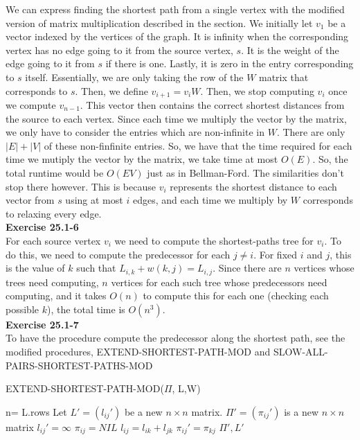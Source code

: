 \documentclass{article}
\begin{document}
We can express finding the shortest path from a single vertex with the modified version of matrix multiplication described in the section. We initially let $v_1$ be a vector indexed by the vertices of the graph. It is infinity when the corresponding vertex has no edge going to it from the source vertex, $s$. It is the weight of the edge going to it from $s$ if there is one. Lastly, it is zero in the entry corresponding to $s$ itself. Essentially, we are only taking the row of the $W$ matrix that corresponds to $s$. Then, we define $v_{i+1} = v_i W$. Then, we stop computing $v_i$ once we compute $v_{n-1}$. This vector then contains the correct shortest distances from the source to each vertex. Since each time we multiply the vector by the matrix, we only have to consider the entries which are non-infinite in $W$. There are only $|E|+|V|$ of these non-finfinite entries. So, we have that the time required for each time we mutiply the vector by the matrix, we take time at most $O(E)$. So, the total runtime would be $O(EV)$ just as in Bellman-Ford. The similarities don't stop there however. This is because $v_i$ represents the shortest distance to each vector from $s$ using at most $i$ edges, and each time we multiply by $W$ corresponds to relaxing every edge.\\

\noindent\textbf{Exercise 25.1-6}\\

For each source vertex $v_i$ we need to compute the shortest-paths tree for $v_i$.  To do this, we need to compute the predecessor for each $j \neq i$.  For fixed $i$ and $j$, this is the value of $k$ such that $L_{i,k} + w(k,j) = L_{i,j}$. Since there are $n$ vertices whose trees need computing, $n$ vertices for each such tree whose predecessors need computing, and it takes $O(n)$ to compute this for each one (checking each possible $k$), the total time is $O(n^3)$. \\

\noindent\textbf{Exercise 25.1-7}\\
To have the procedure compute the predecessor along the shortest path, see the modified procedures, EXTEND-SHORTEST-PATH-MOD and SLOW-ALL-PAIRS-SHORTEST-PATHS-MOD

\begin{algorithm}
\caption{EXTEND-SHORTEST-PATH-MOD($\Pi$, L,W)}
\begin{algorithmic}
\State n= L.rows
\State Let $L' = (l_{ij}')$ be a new $n\times n$ matrix.
\State $\Pi' = (\pi_{ij}')$ is a new $n\times n$ matrix
\State $l_{ij}' = \infty$
\State $\pi_{ij} = NIL$
\State $l_{ij} = l_{ik}+l_{jk}$
\State $\pi_{ij}' = \pi_{kj}$
\EndIf
\EndFor
\EndFor
\EndFor
\State \Return $\Pi', L'$
\end{algorithmic}
\end{algorithm}
\end{document}
